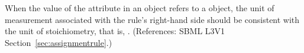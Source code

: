 When the value of the attribute  in an \AssignmentRule
object refers to a \SpeciesReference object, the unit of measurement
associated with the rule's right-hand side should be consistent with the
unit of stoichiometry, that is, .  (References: SBML
L3V1 Section~\ref{sec:assignmentrule}.)
